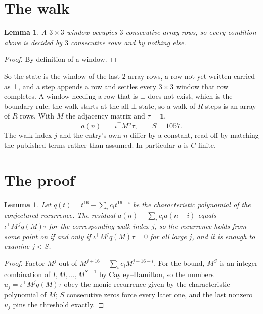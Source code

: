 \documentclass[11pt,a4paper]{article}
\theoremstyle{plain}
\newtheorem{lemma}[theorem]{Lemma}
\theoremstyle{definition}
\begin{document}
\section{The walk}

\begin{lemma}\label{lem:win}
A $3\times3$ window occupies $3$ consecutive array rows, so every condition above is
decided by $3$ consecutive rows and by nothing else.
\end{lemma}

\begin{proof}
By definition of a window.
\end{proof}

So the state is the window of the last $2$ array rows, a row not yet written carried as
$\bot$, and a step appends a row and settles every $3\times3$ window that row completes. A
window needing a row that is $\bot$ does not exist, which is the boundary rule; the walk starts
at the all-$\bot$ state, so a walk of $R$ steps is an array of $R$ rows. With $M$ the adjacency
matrix and $\tau=\mathbf{1}$,
\[
a(n)\;=\;\iota^{\!\top}M^{\,j}\tau ,\qquad S=1057.
\]
The walk index $j$ and the entry's own $n$ differ by a constant, read off by matching the
published terms rather than assumed. In particular $a$ is $C$-finite.

\section{The proof}

\begin{lemma}\label{lem:crit}
Let $q(t)=t^{16}-\sum_i c_it^{16-i}$ be the characteristic polynomial of the
conjectured recurrence. The residual $a(n)-\sum_ic_ia(n-i)$ equals
$\iota^{\!\top}M^{\,j}q(M)\tau$ for the corresponding walk index $j$, so the recurrence
holds from some point on if and only if $\iota^{\!\top}M^{j}q(M)\tau=0$ for all large $j$,
and it is enough to examine $j<S$.
\end{lemma}

\begin{proof}
Factor $M^{j}$ out of $M^{j+16}-\sum_ic_iM^{j+16-i}$. For the bound, $M^{S}$
is an integer combination of $I,M,\dots,M^{S-1}$ by Cayley--Hamilton, so the numbers
$u_j=\iota^{\!\top}M^{j}q(M)\tau$ obey the monic recurrence given by the characteristic
polynomial of $M$; $S$ consecutive zeros force every later one, and the last nonzero $u_j$
pins the threshold exactly.
\end{proof}
\end{document}
